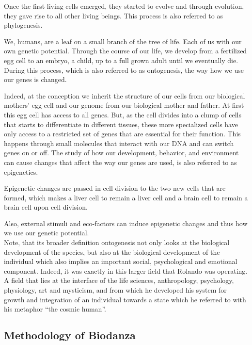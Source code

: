 \documentclass[
  11pt,
]{book}
\begin{document}
Once the first living cells emerged, they started to evolve and through evolution, they gave rise to all other living beings. This process is also referred to as phylogenesis.

We, humans, are a leaf on a small branch of the tree of life. Each of us with our own genetic potential. Through the course of our life, we develop from a fertilized egg cell to an embryo, a child, up to a full grown adult until we eventually die. During this process, which is also referred to as ontogenesis, the way how we use our genes is changed.

Indeed, at the conception we inherit the structure of our cells from our biological mothers' egg cell and our genome from our biological mother and father. At first this egg cell has access to all genes. But, as the cell divides into a clump of cells that starts to differentiate in different tissues, these more specialized cells have only access to a restricted set of genes that are essential for their function. This happens through small molecules that interact with our DNA and can switch genes on or off.
The study of how our development, behavior, and environment can cause changes that affect the way our genes are used, is also referred to as epigenetics.

Epigenetic changes are passed in cell division to the two new cells that are formed, which makes a liver cell to remain a liver cell and a brain cell to remain a brain cell upon cell division.

Also, external stimuli and eco-factors can induce epigenetic changes and thus how we use our genetic potential.\\

Note, that its broader definition ontogenesis not only looks at the biological development of the species, but also at the biological development of the individual which also implies an important social, psychological and emotional component.
Indeed, it was exactly in this larger field that Rolando was operating. A field that lies at the interface of the life sciences, anthropology, psychology, physiology, art and mysticism, and from which he developed his system for growth and integration of an individual towards a state which he referred to with his metaphor ``the cosmic human''.

\hypertarget{methodology-of-biodanza}{%
\subsection{Methodology of Biodanza}\label{methodology-of-biodanza}}
\end{document}
